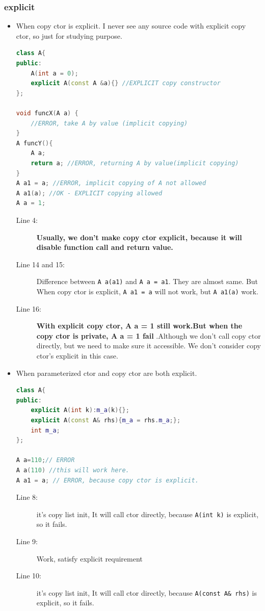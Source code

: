 \documentclass[a4paper,11pt,twoside]{book}
\begin{document}
\subsubsection{explicit}
\begin{itemize}
	\item When copy ctor is explicit. I never see any source code with explicit copy ctor, so just for studying purpose. 
\begin{lstlisting}[frame=single, language=c++]
class A{
public:
	A(int a = 0);
	explicit A(const A &a){} //EXPLICIT copy constructor
};
	
void funcX(A a) {
	//ERROR, take A by value (implicit copying)
}
A funcY(){ 
	A a;
	return a; //ERROR, returning A by value(implicit copying)
}
A a1 = a; //ERROR, implicit copying of A not allowed
A a1(a); //OK - EXPLICIT copying allowed
A a = 1;
\end{lstlisting}
	\begin{description}
		\item[Line 4:] \textbf{Usually, we don't make copy ctor explicit, because it will disable function call and return value.}
		
		\item[Line 14 and 15:] Difference between \texttt{A a(a1)} and \texttt{A a = a1}.  They are almost same. But When copy ctor is explicit,  \texttt{A a1 = a} will not work, but \texttt{A a1(a)} work.
		
		\item[Line 16:] \textbf{With explicit copy ctor, A a = 1 still work.But when the copy ctor is private, A a = 1 fail }.Although we don't call copy ctor directly, but we need to make sure it accessible. We don't consider copy ctor's explicit in this case.
	\end{description}
	
	\item When parameterized ctor and copy ctor are both explicit.
\begin{lstlisting}[frame=single, language=c++]
class A{
public:
	explicit A(int k):m_a(k){};
	explicit A(const A& rhs){m_a = rhs.m_a;};
	int m_a;
};
	
A a=110;// ERROR
A a(110) //this will work here.
A a1 = a; // ERROR, because copy ctor is explicit.
\end{lstlisting}
	\begin{description}
		\item[Line 8:] it's copy list init, It will call ctor directly, because \texttt{A(int k)} is explicit, so it fails.
		\item[Line 9:] Work, satisfy explicit requirement
		\item[Line 10:] it's copy list init, It will call ctor directly, because \texttt{A(const A\& rhs)} is explicit, so it fails.
	\end{description}
	

\end{itemize}
\end{document}
